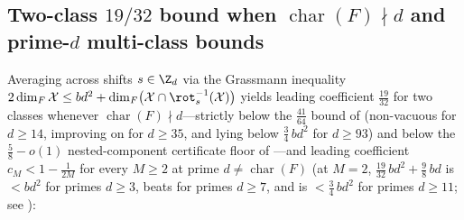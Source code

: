 \subsection{Two-class \texorpdfstring{$19/32$}{19/32} bound when \texorpdfstring{$\operatorname{char}(F) \nmid d$}{char(F) does not divide d} and prime-\texorpdfstring{$d$}{d} multi-class bounds}\label{sec:19-32}

Averaging  across shifts $s \in \Z_d$ via the Grassmann inequality
$2\dim_F \mathcal{X} \le b d^2 + \dim_F\bigl(\mathcal{X} \cap \rot_s^{-1}(\mathcal{X})\bigr)$ yields
leading coefficient $\frac{19}{32}$ for two classes whenever $\operatorname{char}(F) \nmid d$---strictly
below the $\frac{41}{64}$ bound of \cite[Theorem~3.4]{SharedDecoders2026} (non-vacuous for $d \ge 14$,
improving on \cite[Theorem~3.5]{SharedDecoders2026} for $d \ge 35$, and lying below
$\frac{3}{4}\,b d^2$ for $d \ge 93$) and below the $\frac{5}{8} - o(1)$
nested-component certificate floor of \cite[Theorem~C.6]{SharedDecoders2026}---and leading coefficient
$c_M < 1 - \frac{1}{2M}$ for every $M \ge 2$ at prime $d \ne \operatorname{char}(F)$ (at $M = 2$,
$\frac{19}{32}\,b d^2 + \frac{9}{8}\,b d$ is $< b d^2$ for primes $d \ge 3$, beats
\cite[Theorem~3.5]{SharedDecoders2026} for primes $d \ge 7$, and is $< \frac{3}{4}\,b d^2$ for primes
$d \ge 11$; see ):

